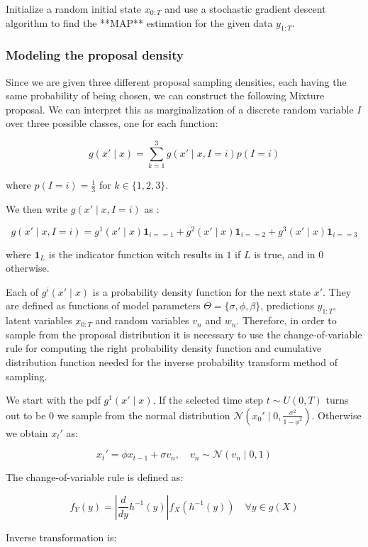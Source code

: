 \documentclass[]{article}
\begin{document}
Initialize a random initial state $x_{0:T}$ and use a stochastic gradient descent algorithm to find the **MAP** estimation for the given data $y_{1:T}$.

\subsubsection*{Modeling the proposal density}

Since we are given three different proposal sampling densities, each having the same probability of being chosen, we can construct the following Mixture proposal. We can interpret this as marginalization of a discrete random variable $I$ over three possible classes, one for each function:

$$ g(x' \mid x) = \sum_{k=1}^3 g(x' \mid x, I=i) p(I=i) $$

where $p(I=i)=\frac{1}{3}$ for $ k \in \{ 1,2,3 \}$. 

We then write $ g(x' \mid x, I=i) $ as :

$$ g(x' \mid x, I=i) = g^1(x' \mid x)  \mathbf{1}_{i==1} + g^2(x' \mid x)  \mathbf{1}_{i==2} + g^3(x' \mid x)  \mathbf{1}_{i==3}  $$

where $\mathbf{1}_{L}$ is the indicator function witch results in $1$ if $L$ is true, and in $0$ otherwise. 

Each of $g^i(x' \mid x)$ is a probability density function for the next state $x'$. They are defined as functions of model parameters $\Theta = \{ \sigma, \phi, \beta \}$, predictions $y_{1:T}$, latent variables $x_{0:T}$ and random variables $v_n$ and $w_n$. Therefore, in order to sample from the proposal distribution it is necessary to use the change-of-variable rule for computing the right probability density function and cumulative distribution function needed for the inverse probability transform method of sampling. 

We start with the pdf $g^1(x' \mid x)$. If the selected time step $ t \sim U(0,T)$ turns out to be $0$ we sample from the normal distribution $\mathcal{N}(x_0' \mid 0, \frac{\sigma^2}{1-\phi^2})$. Otherwise we obtain $x_t'$ as:

$$ x_t' = \phi x_{t-1} + \sigma v_n , \quad v_n \sim \mathcal{N}(v_n \mid 0,1) $$

The change-of-variable rule is defined as:

$$ f_Y(y) = \left | \frac{d}{dy} h^{-1}(y) \right | f_X(h^{-1}(y)) \quad \forall y \in g(X)$$

Inverse transformation is:
\end{document}

